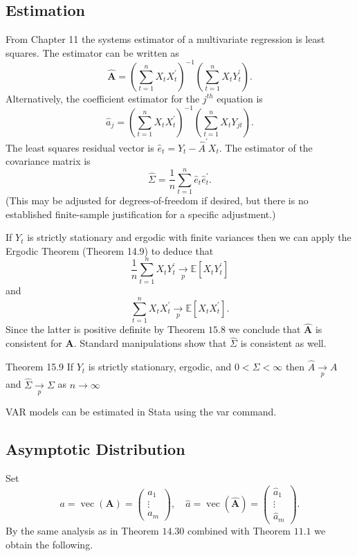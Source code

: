 \documentclass[10pt]{article}
\begin{document}
\subsection{Estimation}
From Chapter 11 the systems estimator of a multivariate regression is least squares. The estimator can be written as
$$
\widehat{\boldsymbol{A}}=\left(\sum_{t=1}^{n} X_{t} X_{t}^{\prime}\right)^{-1}\left(\sum_{t=1}^{n} X_{t} Y_{t}^{\prime}\right) .
$$
Alternatively, the coefficient estimator for the $j^{t h}$ equation is
$$
\widehat{a}_{j}=\left(\sum_{t=1}^{n} X_{t} X_{t}^{\prime}\right)^{-1}\left(\sum_{t=1}^{n} X_{t} Y_{j t}\right) .
$$
The least squares residual vector is $\widehat{e}_{t}=Y_{t}-\widehat{A}^{\prime} X_{t}$. The estimator of the covariance matrix is
$$
\widehat{\Sigma}=\frac{1}{n} \sum_{t=1}^{n} \widehat{e}_{t} \widehat{e}_{t}^{\prime} .
$$
(This may be adjusted for degrees-of-freedom if desired, but there is no established finite-sample justification for a specific adjustment.)

If $Y_{t}$ is strictly stationary and ergodic with finite variances then we can apply the Ergodic Theorem (Theorem 14.9) to deduce that
$$
\frac{1}{n} \sum_{t=1}^{n} X_{t} Y_{t}^{\prime} \underset{p}{\longrightarrow} \mathbb{E}\left[X_{t} Y_{t}^{\prime}\right]
$$
and
$$
\sum_{t=1}^{n} X_{t} X_{t}^{\prime} \underset{p}{\longrightarrow} \mathbb{E}\left[X_{t} X_{t}^{\prime}\right] .
$$
Since the latter is positive definite by Theorem $15.8$ we conclude that $\widehat{\boldsymbol{A}}$ is consistent for $\boldsymbol{A}$. Standard manipulations show that $\widehat{\Sigma}$ is consistent as well.

Theorem 15.9 If $Y_{t}$ is strictly stationary, ergodic, and $0<\Sigma<\infty$ then $\widehat{A} \underset{p}{\rightarrow} A$ and $\widehat{\Sigma} \underset{p}{\longrightarrow} \Sigma$ as $n \rightarrow \infty$

VAR models can be estimated in Stata using the var command.

\subsection{Asymptotic Distribution}
Set
$$
a=\operatorname{vec}(\boldsymbol{A})=\left(\begin{array}{c}
a_{1} \\
\vdots \\
a_{m}
\end{array}\right), \quad \widehat{a}=\operatorname{vec}(\widehat{\boldsymbol{A}})=\left(\begin{array}{c}
\widehat{a}_{1} \\
\vdots \\
\widehat{a}_{m}
\end{array}\right) .
$$
By the same analysis as in Theorem $14.30$ combined with Theorem $11.1$ we obtain the following.
\end{document}
